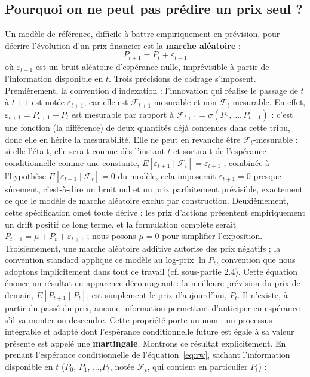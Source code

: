 \documentclass{article}
\begin{document}
\subsection{Pourquoi on ne peut pas prédire un prix seul ?}
Un modèle de référence, difficile à battre empiriquement en prévision,  pour décrire l'évolution d'un prix financier est la \textbf{marche aléatoire} :
\begin{equation}
P_{t+1} = P_t + \varepsilon_{t+1}
\label{eq:rw}
\end{equation}
où $\varepsilon_{t+1}$ est un bruit aléatoire d'espérance nulle, imprévisible à partir de l'information disponible en $t$. Trois précisions de cadrage s'imposent. Premièrement, la convention d'indexation : l'innovation qui réalise le passage de $t$ à $t+1$ est notée $\varepsilon_{t+1}$, car elle est $\mathcal{F}_{t+1}$-mesurable et non $\mathcal{F}_t$-mesurable. En effet, $\varepsilon_{t+1}=P_{t+1}-P_t$ est mesurable par rapport à $\mathcal{F}_{t+1}=\sigma(P_0,\dots,P_{t+1})$ : c'est une fonction (la différence) de deux quantités déjà contenues dans cette tribu, donc elle en hérite la mesurabilité. Elle ne peut en revanche être $\mathcal{F}_t$-mesurable : si elle l'était, elle serait connue dès l'instant $t$ et sortirait de l'espérance conditionnelle comme une constante, $E[\varepsilon_{t+1}\mid\mathcal{F}_t]=\varepsilon_{t+1}$ ; combinée à l'hypothèse $E[\varepsilon_{t+1}\mid\mathcal{F}_t]=0$ du modèle, cela imposerait $\varepsilon_{t+1}=0$ presque sûrement, c'est-à-dire un bruit nul et un prix parfaitement prévisible, exactement ce que le modèle de marche aléatoire exclut par construction.
Deuxièmement, cette spécification omet toute dérive : les prix d'actions présentent empiriquement un drift positif de long terme, et la formulation complète serait $P_{t+1}=\mu+P_t+\varepsilon_{t+1}$ ; nous posons $\mu=0$ pour simplifier l'exposition. Troisièmement, une marche aléatoire additive autorise des prix négatifs ; la convention standard applique ce modèle au log-prix $\ln P_t$, convention que nous adoptons implicitement dans tout ce travail (cf. sous-partie 2.4). Cette équation énonce un résultat en apparence décourageant : la meilleure prévision du prix de demain, $E[P_{t+1} \mid P_t]$, est simplement le prix d'aujourd'hui, $P_t$. Il n'existe, à partir du passé du prix, aucune information permettant d'anticiper en espérance s'il va monter ou descendre. Cette propriété porte un nom : un processus intégrable et adapté dont l'espérance conditionnelle future est égale à sa valeur présente est appelé une \textbf{martingale}. Montrons ce résultat explicitement. En prenant l'espérance conditionnelle de l'équation~\eqref{eq:rw}, sachant l'information disponible en $t$ ($P_0$, $P_1$, ...,$P_t$, notée $\mathcal{F}_t$, qui contient en particulier $P_t$) :
\end{document}
